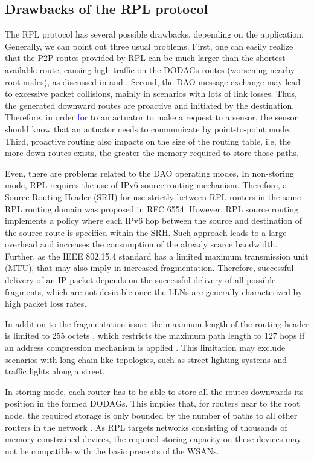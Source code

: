 \documentclass[authoryear,preprint,review,12pt]{elsarticle}
\newcommand{\rev}{\textcolor{blue}}
\begin{document}
\subsection{Drawbacks of the RPL protocol}

The RPL protocol has several possible drawbacks, depending on the application. Generally, we can point out three usual problems. First, one can easily realize that the P2P routes provided by RPL can be much larger than the shortest available route, causing high traffic on the DODAGs routes (worsening nearby root nodes), as discussed in \citep{P2P_analysis_2010} and \citep{P2P-RPL_2011}. Second, the DAO message exchange may lead to excessive packet collisions, mainly in scenarios with lots of link losses. Thus, the generated downward routes are proactive and initiated by the destination. Therefore, in order \rev{for} \sout{to} an actuator \rev{to} make a request to a sensor, the sensor should know that an actuator needs to communicate by point-to-point mode. Third, proactive routing also impacts on the size of the routing table, i.e, the more down routes exists, the greater the memory required to store those paths.

Even, there are problems related to the DAO operating modes. In non-storing mode, RPL requires the use of IPv6 source routing mechanism. Therefore, a Source Routing Header (SRH) for use strictly between RPL routers in the same RPL routing domain was proposed in RFC 6554. However, RPL source routing implements a policy where each IPv6 hop between the source and destination of the source route is specified within the SRH. Such approach leads to a large overhead and increases the consumption of the already scarce bandwidth. Further, as the IEEE 802.15.4 standard has a limited maximum transmission unit (MTU), that may also imply in increased fragmentation. Therefore, successful delivery of an IP packet depends on the successful delivery of all possible fragments, which are not desirable once the LLNs are generally characterized by high packet loss rates.

In addition to the fragmentation issue, the maximum length of the routing header is limited to 255 octets \citep{RFC4944}, which restricts the maximum path length to 127 hops if an address compression mechanism is applied \citep{herberg}. This limitation may exclude scenarios with long chain-like topologies, such as street lighting systems and traffic lights along a street.

In storing mode, each router has to be able to store all the routes downwards its position in the formed DODAGs. This implies that, for routers near to the root node, the required storage is only bounded by the number of paths to all other routers in the network \citep{RPL_observations}. As RPL targets networks consisting of thousands of memory-constrained devices, the required storing capacity on these devices may not be compatible with the basic precepts of the WSANs.
\end{document}
